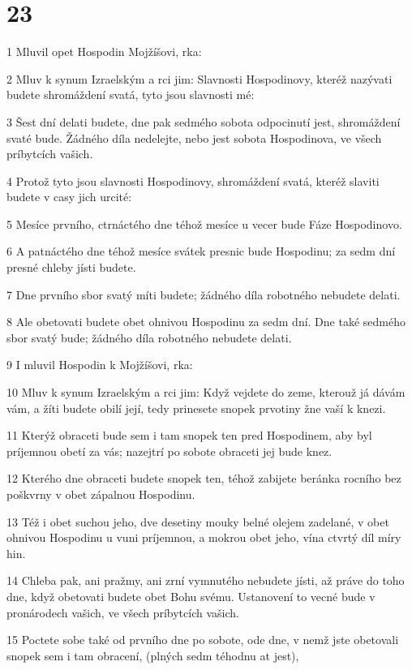 \chapter{23}

\par 1 Mluvil opet Hospodin Mojžíšovi, rka:
\par 2 Mluv k synum Izraelským a rci jim: Slavnosti Hospodinovy, kteréž nazývati budete shromáždení svatá, tyto jsou slavnosti mé:
\par 3 Šest dní delati budete, dne pak sedmého sobota odpocinutí jest, shromáždení svaté bude. Žádného díla nedelejte, nebo jest sobota Hospodinova, ve všech príbytcích vašich.
\par 4 Protož tyto jsou slavnosti Hospodinovy, shromáždení svatá, kteréž slaviti budete v casy jich urcité:
\par 5 Mesíce prvního, ctrnáctého dne téhož mesíce u vecer bude Fáze Hospodinovo.
\par 6 A patnáctého dne téhož mesíce svátek presnic bude Hospodinu; za sedm dní presné chleby jísti budete.
\par 7 Dne prvního sbor svatý míti budete; žádného díla robotného nebudete delati.
\par 8 Ale obetovati budete obet ohnivou Hospodinu za sedm dní. Dne také sedmého sbor svatý bude; žádného díla robotného nebudete delati.
\par 9 I mluvil Hospodin k Mojžíšovi, rka:
\par 10 Mluv k synum Izraelským a rci jim: Když vejdete do zeme, kterouž já dávám vám, a žíti budete obilí její, tedy prinesete snopek prvotiny žne vaší k knezi.
\par 11 Kterýž obraceti bude sem i tam snopek ten pred Hospodinem, aby byl príjemnou obetí za vás; nazejtrí po sobote obraceti jej bude knez.
\par 12 Kterého dne obraceti budete snopek ten, téhož zabijete beránka rocního bez poškvrny v obet zápalnou Hospodinu.
\par 13 Též i obet suchou jeho, dve desetiny mouky belné olejem zadelané, v obet ohnivou Hospodinu u vuni príjemnou, a mokrou obet jeho, vína ctvrtý díl míry hin.
\par 14 Chleba pak, ani pražmy, ani zrní vymnutého nebudete jísti, až práve do toho dne, když obetovati budete obet Bohu svému. Ustanovení to vecné bude v pronárodech vašich, ve všech príbytcích vašich.
\par 15 Poctete sobe také od prvního dne po sobote, ode dne, v nemž jste obetovali snopek sem i tam obracení, (plných sedm téhodnu at jest),
